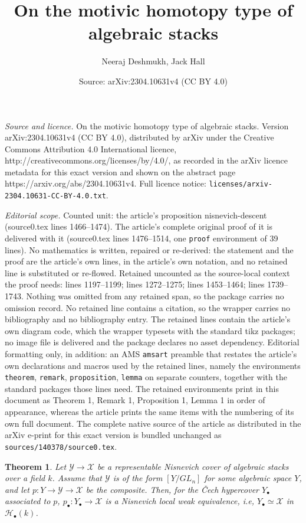 \documentclass[10pt,a4paper]{amsart}
\title{On the motivic homotopy type of algebraic stacks}
\author{Neeraj Deshmukh, Jack Hall}
\date{Source: arXiv:2304.10631v4 (CC BY 4.0)}
\newtheorem{theorem}{Theorem}
\newcommand{\sH}{{\mathcal H}}
\newcommand{\sX}{{\mathcal X}}
\newcommand{\sY}{{\mathcal Y}}
\begin{document}
\maketitle

\noindent\emph{Source and licence.} On the motivic homotopy type of algebraic stacks. Version arXiv:2304.10631v4 (CC BY 4.0), distributed by arXiv under the Creative Commons Attribution 4.0 International licence, http://creativecommons.org/licenses/by/4.0/, as recorded in the arXiv licence metadata for this exact version and shown on the abstract page https://arxiv.org/abs/2304.10631v4. Full licence notice: \texttt{licenses/arxiv-2304.10631-CC-BY-4.0.txt}.\par\smallskip

\noindent\textit{Editorial scope.} Counted unit: the article's proposition nisnevich-descent (source0.tex lines 1466--1474). The article's complete original proof of it is delivered with it (source0.tex lines 1476--1514, one \texttt{proof} environment of 39 lines). No mathematics is written, repaired or re-derived: the statement and the proof are the article's own lines, in the article's own notation, and no retained line is substituted or re-flowed.  Retained uncounted as the source-local context the proof needs: lines 1197--1199; lines 1272--1275; lines 1453--1464; lines 1739--1743.  Nothing was omitted from any retained span, so the package carries no omission record.  No retained line contains a citation, so the wrapper carries no bibliography and no bibliography entry.  The retained lines contain the article's own diagram code, which the wrapper typesets with the standard tikz packages; no image file is delivered and the package declares no asset dependency.  Editorial formatting only, in addition: an AMS \texttt{amsart} preamble that restates the article's own declarations and macros used by the retained lines, namely the environments \texttt{theorem}, \texttt{remark}, \texttt{proposition}, \texttt{lemma} on separate counters, together with the standard packages those lines need.  The retained environments print in this document as Theorem 1, Remark 1, Proposition 1, Lemma 1 in order of appearance, whereas the article prints the same items with the numbering of its own full document.  The complete native source of the article as distributed in the arXiv e-print for this exact version is bundled unchanged as \texttt{sources/140378/source0.tex}.
\begin{theorem}\label{motive-construction}
	Let $\sY\rightarrow \sX$ be a representable Nisnevich cover of algebraic stacks over a field $k$. Assume that $\sY$ is of the form $[Y/GL_n]$ for some algebraic space $Y$, and let $p:Y\rightarrow\sY\rightarrow\sX$ be the composite. Then, for the \v{C}ech hypercover $Y_{\bullet}$ associated to $p $, $p_{\bullet}:Y_{\bullet}\rightarrow \sX$ is a Nisnevich local weak equivalence, i.e, $Y_{\bullet}\simeq \sX$ in $\sH_{\bullet}(k)$.
\end{theorem}
\end{document}
